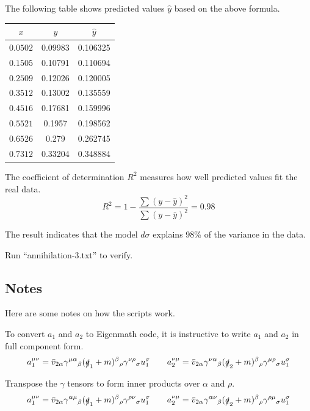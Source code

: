 \documentclass[12pt]{article}
\begin{document}
\noindent
The following table shows predicted values $\hat{y}$ based on the above formula.

\begin{center}
\begin{tabular}{|c|c|c|}
\hline
$x$ & $y$ & $\hat{y}$\\
\hline
$0.0502$ & 0.09983 & 0.106325\\
$0.1505$ & 0.10791 & 0.110694\\
$0.2509$ & 0.12026 & 0.120005\\
$0.3512$ & 0.13002 & 0.135559\\
$0.4516$ & 0.17681 & 0.159996\\
$0.5521$ & 0.1957\phantom{0} & 0.198562\\
$0.6526$ & 0.279\phantom{00} & 0.262745\\
$0.7312$ & 0.33204 & 0.348884\\
\hline
\end{tabular}
\end{center}

\noindent
The coefficient of determination $R^2$ measures how well predicted values fit the real data.
\begin{equation*}
R^2=1-\frac{\sum(y-\hat{y})^2}{\sum(y-\bar{y})^2}=0.98
\end{equation*}

\noindent
The result indicates that the model $d\sigma$ explains 98\% of the variance in the data.

\bigskip
\noindent
Run ``annihilation-3.txt'' to verify.

\subsection*{Notes}
Here are some notes on how the scripts work.

\bigskip
\noindent
To convert $a_1$ and $a_2$ to Eigenmath code,
it is instructive to write $a_1$ and $a_2$ in full component form.
\begin{equation*}
a_1^{\mu\nu}
=\bar{v}_{2\alpha}\gamma^{\mu\alpha}{}_\beta(\slashed{q}_1+m)^\beta{}_\rho\gamma^{\nu\rho}{}_\sigma u_1^\sigma
\qquad
a_2^{\nu\mu}
=\bar{v}_{2\alpha}\gamma^{\nu\alpha}{}_\beta(\slashed{q}_2+m)^\beta{}_\rho\gamma^{\mu\rho}{}_\sigma u_1^\sigma
\end{equation*}

\noindent
Transpose the $\gamma$ tensors to form inner products over $\alpha$ and $\rho$.
\begin{equation*}
a_1^{\mu\nu}
=\bar{v}_{2\alpha}\gamma^{\alpha\mu}{}_\beta(\slashed{q}_1+m)^\beta{}_\rho\gamma^{\rho\nu}{}_\sigma u_1^\sigma
\qquad
a_2^{\nu\mu}
=\bar{v}_{2\alpha}\gamma^{\alpha\nu}{}_\beta(\slashed{q}_2+m)^\beta{}_\rho\gamma^{\rho\mu}{}_\sigma u_1^\sigma
\end{equation*}
\end{document}
